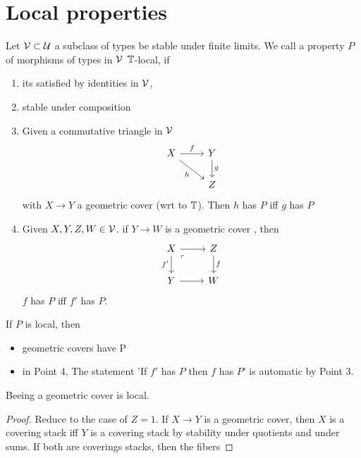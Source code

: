 \section{Local properties}

\begin{definition}
	Let $\mathcal{V} \subset \mathcal{U}$ a subclass of types be stable under finite limits. 
	We call a property $P$ of morphisms of types in $\mathcal{V}$ $\mathbb{T}$-local, if 
	\begin{enumerate}
		\item its satisfied by identities in $\mathcal{V}$,
		\item stable under composition 
		\item
		Given a commutative triangle in $\mathcal{V}$%
		\[\begin{tikzcd}
			X & Y \\
			& Z
			\arrow["f", from=1-1, to=1-2]
			\arrow["h"', from=1-1, to=2-2]
			\arrow["g", from=1-2, to=2-2]
		\end{tikzcd}\]
		with $X \to Y$ a geometric cover (wrt to $\mathbb{T}$). Then $h$ has $P$ iff $g$ has $P$
		\item Given $X,Y,Z,W \in \mathcal{V}$. if $Y \to W$ is a geometric cover , then 
		\[\begin{tikzcd}
			X & Z \\
			Y & W
			\arrow[from=1-1, to=1-2]
			\arrow["{f'}"', from=1-1, to=2-1]
			\arrow["\ulcorner"{anchor=center, pos=0.125}, draw=none, from=1-1, to=2-2]
			\arrow["f", from=1-2, to=2-2]
			\arrow[from=2-1, to=2-2]
		\end{tikzcd}\]
		$f$ has $P$ iff $f'$ has $P$.
	
	\end{enumerate}
	\begin{lemma}{\label{lemma:local}}
		If $P$ is local, then 
		\begin{itemize}
			\item geometric covers have P
			\item in Point 4, The statement 'If $f'$ has $P$ then $f$ has $P$' is automatic by Point 3.
		\end{itemize}
	\end{lemma}
\end{definition}
\begin{lemma}
	Beeing a geometric cover is local.
\end{lemma}
\begin{proof}
	Reduce to the case of $Z = 1$. If $X \to Y$ is a geometric cover, then $X$ is a covering stack iff $Y$ is a covering stack by stability under quotients and under sums. If both are coverings stacks, then the fibers 
\end{proof}

